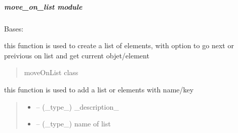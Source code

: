 \documentclass[letterpaper,10pt,english]{sphinxmanual}
\begin{document}
\subparagraph{move\_on\_list module}
\label{\detokenize{setting/utils/move_on_list:module-oxin.utils.move_on_list}}\label{\detokenize{setting/utils/move_on_list:move-on-list-module}}\label{\detokenize{setting/utils/move_on_list::doc}}

\begin{savenotes}\begin{fulllineitems}
\label{\detokenize{setting/utils/move_on_list:oxin.utils.move_on_list.moveOnList}}
\pysigstartsignatures
{}
\pysigstopsignatures
\sphinxAtStartPar
Bases: 

\sphinxAtStartPar
this function is used to create a list of elements, with option to go next or preivious on list and
get current objet/element
\begin{quote}\begin{description}
\sphinxAtStartPar
moveOnList class

\end{description}\end{quote}

\begin{savenotes}\begin{fulllineitems}
\label{\detokenize{setting/utils/move_on_list:oxin.utils.move_on_list.moveOnList.add}}
\pysigstartsignatures
{}
\pysigstopsignatures
\sphinxAtStartPar
this function is used to add a list or elements with name/key
\begin{quote}\begin{description}
\begin{itemize}
\item {} 
\sphinxAtStartPar
{} – (\_type\_) \_description\_

\item {} 
\sphinxAtStartPar
{} – (\_type\_) name of list


\end{itemize}
\end{description}
\end{quote}
\end{fulllineitems}
\end{savenotes}
\end{fulllineitems}
\end{savenotes}
\end{document}
